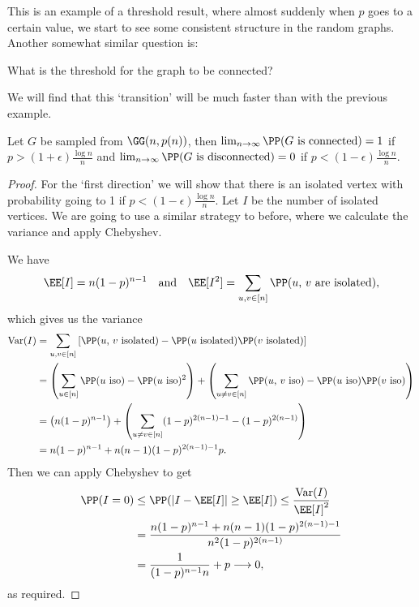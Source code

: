 This is an example of a threshold result, where almost suddenly when $p$ goes to a  certain value, we start to see some consistent structure in the random graphs.
Another somewhat similar question is:
\begin{center}
	What is the threshold for the graph to be connected?
\end{center}
We will find that this `transition' will be much faster than with the previous example.

\begin{theorem}
	Let $G$ be sampled from $\GG(n, p(n))$, then $\lim_{n \to \infty} \PP(\text{$G$ is connected}) = 1$ if $p > (1 + \epsilon)\frac{\log n}{n}$ and $\lim_{n \to \infty} \PP(\text{$G$ is disconnected}) = 0$ if $p < (1 - \epsilon) \frac{\log n}{n}$. 
\end{theorem}
\begin{proof}
	For the `first direction' we will show that there is an isolated vertex with probability going to 1 if $p < (1 - \epsilon)\frac{\log n}{n}$.
	Let $I$ be the number of isolated vertices. We are going to use a similar strategy to before, where we calculate the variance and apply Chebyshev.

	We have
	$$
	\EE[I] = n(1 - p)^{n - 1} \quad \text{and} \quad \EE[I^2] = \sum_{u, v \in [n]} \PP(\text{$u$, $v$ are isolated}),
	$$
	which gives us the variance
	\begin{align*}
		\operatorname{Var}(I) &= \sum_{u, v \in [n]} \left[\PP(\text{$u$, $v$ isolated}) - \PP(\text{$u$ isolated})\PP(\text{$v$ isolated})\right] \\
		&= \left(\sum_{u \in [n]} \PP(\text{$u$ iso}) - \PP(\text{$u$ iso})^2\right) +\left( \sum_{u \neq v \in [n]} \PP(\text{$u$, $v$ iso}) - \PP(\text{$u$ iso})\PP(\text{$v$ iso})\right)\\
		&= \left(n(1-p)^{n - 1}\right) +\left( \sum_{u \neq v \in [n]} (1 - p)^{2(n - 1) - 1} - (1 - p)^{2(n - 1)}\right) \\
		&= n(1-p)^{n-1}+n(n-1)(1-p)^{2(n-1)-1} p.
	\end{align*}
	Then we can apply Chebyshev to get
	\begin{align*}
		\PP(I = 0) &\leq \PP(|I - \EE [I]| \geq \EE[I]) \leq \frac{\operatorname{Var}(I)}{\EE[I]^2} \\
		&= \frac{n(1-p)^{n-1}+n(n-1)(1-p)^{2(n-1)-1}}{n^{2}(1-p)^{2(n-1)}} \\
		&= \frac{1}{(1-p)^{n-1} n}+p \longrightarrow 0,
	\end{align*}
	as required.


\end{proof}
